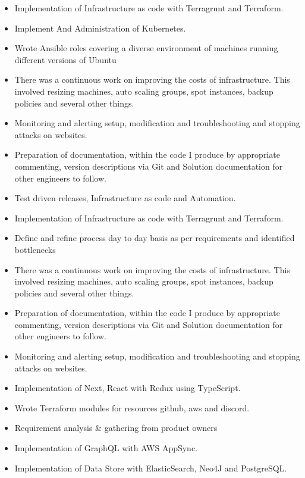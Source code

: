 \begin{itemize}
  \item Implementation of Infrastructure as code with Terragrunt and Terraform.
  \item Implement And Administration of Kubernetes.
  \item Wrote Ansible roles covering a diverse environment of machines running different versions of Ubuntu
  \item There was a continuous work on improving the costs of infrastructure. This involved resizing machines, auto scaling groups, spot instances, backup policies and several other things.
  \item Monitoring and alerting setup, modification and troubleshooting and stopping attacks on websites.
  \item Preparation of documentation, within the code I produce by appropriate commenting, version descriptions via Git and Solution documentation for other engineers to follow.
  \item Test driven releases, Infrastructure as code and Automation.
\end{itemize}

\divider

\begin{itemize}
  \item Implementation of Infrastructure as code with Terragrunt and Terraform.
  \item Define and refine process day to day basis as per requirements and identified bottlenecks
  \item There was a continuous work on improving the costs of infrastructure. This involved resizing machines, auto scaling groups, spot instances, backup policies and several other things.
  \item Preparation of documentation, within the code I produce by appropriate commenting, version descriptions via Git and Solution documentation for other engineers to follow.
  \item Monitoring and alerting setup, modification and troubleshooting and stopping attacks on websites.
  \item Implementation of Next, React with Redux using TypeScript.
  \item Wrote Terraform modules for resources github, aws and discord.
  \item Requirement analysis \& gathering from product owners
  \item Implementation of GraphQL with AWS AppSync.
  \item Implementation of Data Store with ElasticSearch, Neo4J and PostgreSQL.
\end{itemize}

